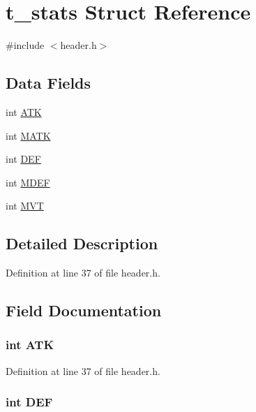 \hypertarget{structt__stats}{\section{t\-\_\-stats Struct Reference}
\label{structt__stats}
}


{\ttfamily \#include $<$header.\-h$>$}

\subsection*{Data Fields}
\begin{DoxyCompactItemize}
\item 
int \hyperlink{structt__stats_a3b3918526788ae6b163c41dc25326396}{A\-T\-K}
\item 
int \hyperlink{structt__stats_ae183b98dc9aca9905f531bfd4dd51a1c}{M\-A\-T\-K}
\item 
int \hyperlink{structt__stats_a30707041436614e9e3759b7bf533b201}{D\-E\-F}
\item 
int \hyperlink{structt__stats_a92ab6d75a95ed209b7875314f53fb555}{M\-D\-E\-F}
\item 
int \hyperlink{structt__stats_a397f7940443939415a50f324dc5f56f9}{M\-V\-T}
\end{DoxyCompactItemize}


\subsection{Detailed Description}


Definition at line 37 of file header.\-h.



\subsection{Field Documentation}
\hypertarget{structt__stats_a3b3918526788ae6b163c41dc25326396}{
\subsubsection[{A\-T\-K}]{\setlength{\rightskip}{0pt plus 5cm}int A\-T\-K}}\label{structt__stats_a3b3918526788ae6b163c41dc25326396}


Definition at line 37 of file header.\-h.

\hypertarget{structt__stats_a30707041436614e9e3759b7bf533b201}{
\subsubsection[{D\-E\-F}]{\setlength{\rightskip}{0pt plus 5cm}int D\-E\-F}}\label{structt__stats_a30707041436614e9e3759b7bf533b201}


